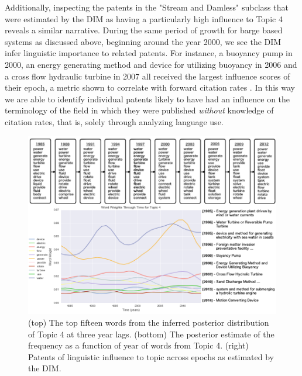 Additionally, inspecting the patents in the "Stream and Damless" subclass that were estimated by the DIM as having a particularly high influence to Topic 4 reveals a similar narrative. During the same period of growth for barge based systems as discussed above, beginning around the year 2000, we see the DIM infer linguistic importance to related patents. For instance, a buoyancy pump in 2000, an energy generating method and device for utilizing buoyancy in 2006 and a cross flow hydraulic turbine in 2007 all received the largest influence scores of their epoch, a metric shown to correlate with forward citation rates \parencite{icml2010_GerrishB10}. In this way we are able to identify individual patents likely to have had an influence on the terminology of the field in which they were published \emph{without} knowledge of citation rates, that is, solely through analyzing language use. 



\begin{figure}[!htb]
\centering
\includegraphics[width=130mm,scale=0.45]{Figures/Topic4}
\decoRule
\caption[wwttTopic4]{(top) The top fifteen words from the inferred posterior distribution of Topic 4 at three year lags. (bottom) The posterior estimate of the frequency as a function of year of words from Topic 4. (right) Patents of linguistic influence to topic across epochs as estimated by the DIM.}
\label{fig:wwttTopic4}
\end{figure}

